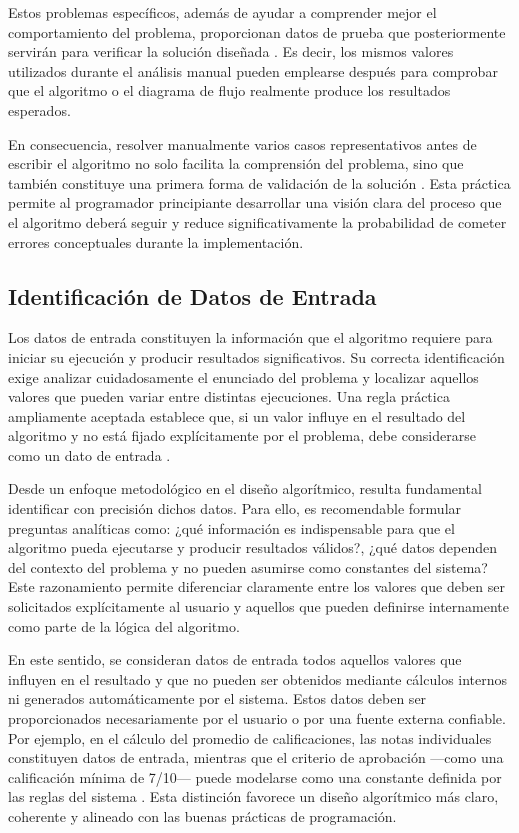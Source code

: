 \documentclass[12pt,twoside]{book}
\begin{document}
						Estos problemas específicos, además de ayudar a comprender mejor el comportamiento del problema, proporcionan datos de prueba que posteriormente servirán para verificar la solución diseñada \cite{Sommerville2015Software}. Es decir, los mismos valores utilizados durante el análisis manual pueden emplearse después para comprobar que el algoritmo o el diagrama de flujo realmente produce los resultados esperados.
						
						En consecuencia, resolver manualmente varios casos representativos antes de escribir el algoritmo no solo facilita la comprensión del problema, sino que también constituye una primera forma de validación de la solución \cite{Pressman2019Software,SWEBOK2025Guide}. Esta práctica permite al programador principiante desarrollar una visión clara del proceso que el algoritmo deberá seguir y reduce significativamente la probabilidad de cometer errores conceptuales durante la implementación.
						
					\subsection{Identificación de Datos de Entrada}
					\noindent
						Los datos de entrada constituyen la información que el algoritmo requiere para iniciar su ejecución y producir resultados significativos. Su correcta identificación exige analizar cuidadosamente el enunciado del problema y localizar aquellos valores que pueden variar entre distintas ejecuciones. Una regla práctica ampliamente aceptada establece que, si un valor influye en el resultado del algoritmo y no está fijado explícitamente por el problema, debe considerarse como un dato de entrada \cite{Gaddis2022Starting}.
						
						Desde un enfoque metodológico en el diseño algorítmico, resulta fundamental identificar con precisión dichos datos. Para ello, es recomendable formular preguntas analíticas como: ¿qué información es indispensable para que el algoritmo pueda ejecutarse y producir resultados válidos?, ¿qué datos dependen del contexto del problema y no pueden asumirse como constantes del sistema? Este razonamiento permite diferenciar claramente entre los valores que deben ser solicitados explícitamente al usuario y aquellos que pueden definirse internamente como parte de la lógica del algoritmo.
						
						En este sentido, se consideran datos de entrada todos aquellos valores que influyen en el resultado y que no pueden ser obtenidos mediante cálculos internos ni generados automáticamente por el sistema. Estos datos deben ser proporcionados necesariamente por el usuario o por una fuente externa confiable. Por ejemplo, en el cálculo del promedio de calificaciones, las notas individuales constituyen datos de entrada, mientras que el criterio de aprobación —como una calificación mínima de 7/10— puede modelarse como una constante definida por las reglas del sistema \cite{Halterman2018Fundamentals}. Esta distinción favorece un diseño algorítmico más claro, coherente y alineado con las buenas prácticas de programación.
						
\end{document}
